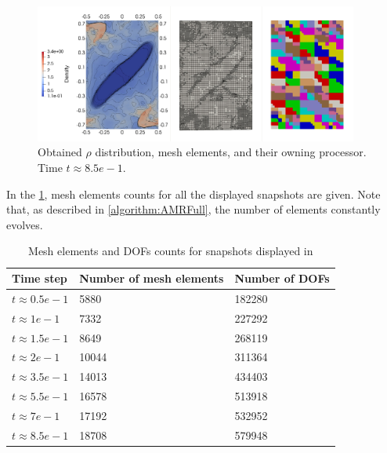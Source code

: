 \begin{figure}[H]
	\begin{center}
		\includegraphics[width=0.95\textwidth]{img/mhd-blast/new/adapt-full16.jpg}
\vspace{-3mm}
	\caption{Obtained $\rho$ distribution, mesh elements, and their owning processor. Time $t\approx 8.5e-1$.}
	\label{figure:amrBlast8}
	\end{center}
\end{figure}
\vspace{-6mm}
In the \cref{table:meshElems}, mesh elements counts for all the displayed snapshots are given. Note that, as described in \cref{algorithm:AMRFull}, the number of elements constantly evolves.

\begin{table}[H]
    \begin{tabular}
		{ | l | l | p{5cm} |}
		\hline
    \textbf{Time step} & \textbf{Number of mesh elements} & \textbf{Number of DOFs} \\
		\hline
    $t\approx 0.5e-1$ & 5880 & 182280  \\ \hline
    $t\approx 1e-1$ & 7332 & 227292  \\ \hline
    $t\approx 1.5e-1$ & 8649 & 268119  \\ \hline
    $t\approx 2e-1$ & 10044 & 311364  \\ \hline
    $t\approx 3.5e-1$ & 14013 & 434403  \\ \hline
    $t\approx 5.5e-1$ & 16578  & 513918 \\ \hline
    $t\approx 7e-1$ & 17192 & 532952  \\ \hline
    $t\approx 8.5e-1$ & 18708 & 579948  \\ \hline
    \end{tabular}
	\caption{Mesh elements and DOFs counts for snapshots displayed in }
\label{table:meshElems}
\end{table}

